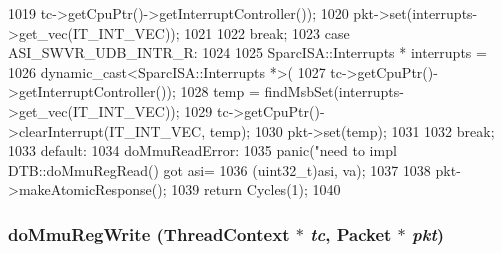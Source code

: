 \begin{DoxyCode}
{{{1019                         tc->getCpuPtr()->getInterruptController());
1020             pkt->set(interrupts->get_vec(IT_INT_VEC));
1021         }
1022         break;
1023       case ASI_SWVR_UDB_INTR_R:
1024         {
1025             SparcISA::Interrupts * interrupts =
1026                 dynamic_cast<SparcISA::Interrupts *>(
1027                         tc->getCpuPtr()->getInterruptController());
1028             temp = findMsbSet(interrupts->get_vec(IT_INT_VEC));
1029             tc->getCpuPtr()->clearInterrupt(IT_INT_VEC, temp);
1030             pkt->set(temp);
1031         }
1032         break;
1033       default:
1034 doMmuReadError:
1035         panic("need to impl DTB::doMmuRegRead() got asi=%
1036             (uint32_t)asi, va);
1037     }
1038     pkt->makeAtomicResponse();
1039     return Cycles(1);
1040 }
\end{DoxyCode}
\hypertarget{classSparcISA_1_1TLB_acdfde16dc50b29fe74f4b7c3f9711d43}{
\subsubsection[{doMmuRegWrite}]{ doMmuRegWrite ({\bf ThreadContext} $\ast$ {\em tc}, \/  {\bf Packet} $\ast$ {\em pkt})}}
\label{classSparcISA_1_1TLB_acdfde16dc50b29fe74f4b7c3f9711d43}




